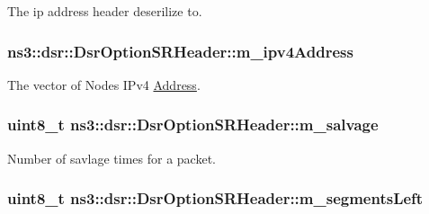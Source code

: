 The ip address header deserilize to. 

\subsubsection[{\texorpdfstring{m\+\_\+ipv4\+Address}{m_ipv4Address}}]{ ns3\+::dsr\+::\+Dsr\+Option\+S\+R\+Header\+::m\+\_\+ipv4\+Address\hspace{0.3cm}{\ttfamily [private]}}\hypertarget{classns3_1_1dsr_1_1DsrOptionSRHeader_a7ae74f398b5a6ba5559532ba3278a7bb}{}\label{classns3_1_1dsr_1_1DsrOptionSRHeader_a7ae74f398b5a6ba5559532ba3278a7bb}


The vector of Nodes\textquotesingle{} I\+Pv4 \hyperlink{classns3_1_1Address}{Address}. 

\subsubsection[{\texorpdfstring{m\+\_\+salvage}{m_salvage}}]{\setlength{\rightskip}{0pt plus 5cm}uint8\+\_\+t ns3\+::dsr\+::\+Dsr\+Option\+S\+R\+Header\+::m\+\_\+salvage\hspace{0.3cm}{\ttfamily [private]}}\hypertarget{classns3_1_1dsr_1_1DsrOptionSRHeader_ad9251524491adff7f9f61244adcbe332}{}\label{classns3_1_1dsr_1_1DsrOptionSRHeader_ad9251524491adff7f9f61244adcbe332}


Number of savlage times for a packet. 

\subsubsection[{\texorpdfstring{m\+\_\+segments\+Left}{m_segmentsLeft}}]{\setlength{\rightskip}{0pt plus 5cm}uint8\+\_\+t ns3\+::dsr\+::\+Dsr\+Option\+S\+R\+Header\+::m\+\_\+segments\+Left\hspace{0.3cm}{\ttfamily [private]}}\hypertarget{classns3_1_1dsr_1_1DsrOptionSRHeader_a269e71e0fe2de16bcafffec1569b91eb}{}\label{classns3_1_1dsr_1_1DsrOptionSRHeader_a269e71e0fe2de16bcafffec1569b91eb}


